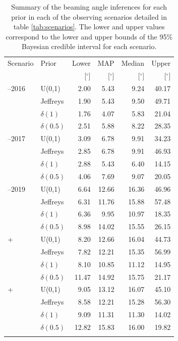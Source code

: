 \documentclass[twocolumn]{aastex61}
\begin{document}
\begin{table}
\centering
\begin{tabular}{llrrrr}
  \toprule
  Scenario & Prior & Lower & MAP & Median & Upper \\
  && [$^{\circ}$] & [$^{\circ}$]    & [$^{\circ}$]    & [$^{\circ}$]  \\
  \colrule
  2015--2016 & U(0,1) 	 & 2.00	 & 5.43	& 9.24	& 40.17	 \\
& Jeffreys 	 & 1.90	 & 5.43	& 9.50	& 49.71	 \\
& $\delta(1)$ 	 & 1.76	 & 4.07	& 5.83	& 21.04	 \\
& $\delta(0.5)$ 	 & 2.51	 & 5.88	& 8.22	& 28.35	 \\
  \colrule
  2016--2017 & U(0,1) 	 & 3.09	 & 6.78	& 9.91	& 34.23	 \\
& Jeffreys 	 & 2.85	 & 6.78	& 9.91	& 46.93	 \\
& $\delta(1)$ 	 & 2.88	 & 5.43	& 6.40	& 14.15	 \\
& $\delta(0.5)$ 	 & 4.06	 & 7.69	& 9.07	& 20.05	 \\
  \colrule
  2018--2019 & U(0,1) 	 & 6.64	 & 12.66	& 16.36	& 46.96	 \\
& Jeffreys 	 & 6.31	 & 11.76	& 15.88	& 57.48	 \\
& $\delta(1)$ 	 & 6.36	 & 9.95	& 10.97	& 18.35	 \\
& $\delta(0.5)$ 	 & 8.98	 & 14.02	& 15.55	& 26.15	 \\
  \colrule
  2020+    
& U(0,1) 	 & 8.20	 & 12.66	& 16.04	& 44.73	 \\
& Jeffreys 	 & 7.82	 & 12.21	& 15.35	& 56.99	 \\
& $\delta(1)$ 	 & 8.10	 & 10.85	& 11.12	& 14.95	 \\
& $\delta(0.5)$ 	 & 11.47	 & 14.92	& 15.75	& 21.17	 \\
  \colrule
  2024+    
& U(0,1) 	 & 9.05	 & 13.12	& 16.07	& 45.10	 \\
& Jeffreys 	 & 8.58	 & 12.21	& 15.28	& 56.30	 \\
& $\delta(1)$ 	 & 9.09	 & 11.31	& 11.30	& 14.02	 \\
           & $\delta(0.5)$ 	 & 12.82	 & 15.83	& 16.00	& 19.82	 \\
  \botrule
\end{tabular}
\caption{Summary of the beaming angle inferences for each prior in each of the observing scenarios detailed in table \ref{tab:scenarios}.
    The lower and upper values correspond to the lower and upper bounds of the 95\% Bayesian credible interval for each scenario.
    \label{tab:aligo_beam_inference}}
\end{table}
\end{document}
